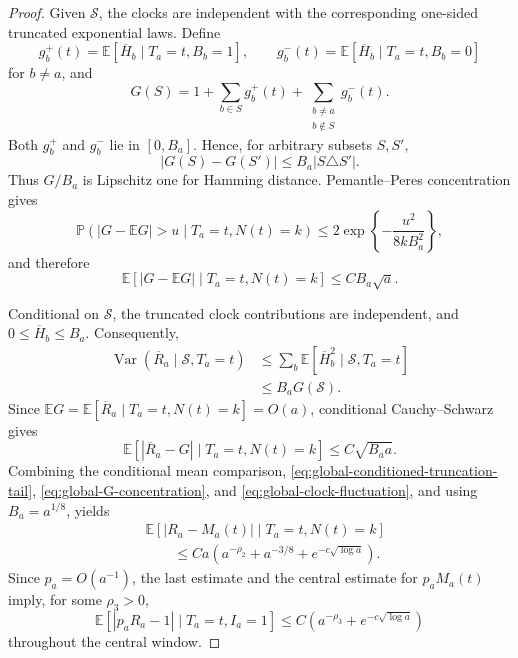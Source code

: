 \documentclass[11pt]{article}
\theoremstyle{remark}
\newcommand{\Pp}{\mathbb P}
\newcommand{\Ee}{\mathbb E}
\newcommand{\Var}{\operatorname{Var}}
\begin{document}
\begin{proof}
Given $\mathcal S$, the clocks are independent with the corresponding one-sided
truncated exponential laws.  Define
\[
        g_b^+(t)=\Ee[\overline H_b\mid T_a=t,B_b=1],
        \qquad
        g_b^-(t)=\Ee[\overline H_b\mid T_a=t,B_b=0]
\]
for $b\ne a$, and
\[
        G(S)=1+\sum_{b\in S}g_b^+(t)
        +\sum_{\substack{b\ne a\\b\notin S}}g_b^-(t).
\]
Both $g_b^+$ and $g_b^-$ lie in $[0,B_a]$.  Hence, for arbitrary subsets
$S,S'$,
\[
        |G(S)-G(S')|
        \le B_a|S\triangle S'|.
\]
Thus $G/B_a$ is Lipschitz one for Hamming distance.  Pemantle--Peres
concentration gives
\[
        \Pp(|G-\Ee G|>u\mid T_a=t,N(t)=k)
        \le2\exp\left\{-\frac{u^2}{8kB_a^2}\right\},
\]
and therefore
\begin{equation}
        \Ee[|G-\Ee G|\mid T_a=t,N(t)=k]
        \le CB_a\sqrt a.
\label{eq:global-G-concentration}
\end{equation}

Conditional on $\mathcal S$, the truncated clock contributions are independent,
and $0\le\overline H_b\le B_a$.  Consequently,
\[
\begin{aligned}
        \Var(\overline R_a\mid\mathcal S,T_a=t)
        &\le\sum_b\Ee[\overline H_b^2\mid\mathcal S,T_a=t]\\
        &\le B_aG(\mathcal S).
\end{aligned}
\]
Since
$\Ee G=\Ee[\overline R_a\mid T_a=t,N(t)=k]=O(a)$, conditional Cauchy--Schwarz
gives
\begin{equation}
        \Ee[|\overline R_a-G|\mid T_a=t,N(t)=k]
        \le C\sqrt{B_aa}.
\label{eq:global-clock-fluctuation}
\end{equation}
Combining the conditional mean comparison,
\eqref{eq:global-conditioned-truncation-tail},
\eqref{eq:global-G-concentration}, and
\eqref{eq:global-clock-fluctuation}, and using $B_a=a^{1/8}$, yields
\[
\begin{aligned}
&\Ee[|R_a-M_a(t)|\mid T_a=t,N(t)=k]\\
&\qquad\le Ca\left(a^{-\rho_2}+a^{-3/8}
        +e^{-c\sqrt{\log a}}\right).
\end{aligned}
\]
Since $p_a=O(a^{-1})$, the last estimate and the central estimate for
$p_aM_a(t)$ imply, for some $\rho_3>0$,
\[
        \Ee[|p_aR_a-1|\mid T_a=t,I_a=1]
        \le C\left(a^{-\rho_3}+e^{-c\sqrt{\log a}}\right)
\]
throughout the central window.


\end{proof}
\end{document}
